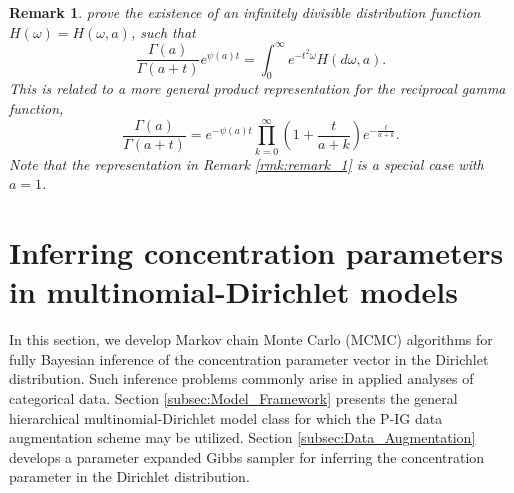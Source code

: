 \documentclass{statsoc}
\newtheorem{remark}{Remark}
\begin{document}
\begin{remark}
\cite{roynette2005couples} prove the existence of an infinitely divisible distribution function $H(\omega) = H(\omega, a)$, such that 
$$
\frac{\Gamma(a)}{\Gamma(a+t)} e^{\psi(a)t} = \int_0^\infty e^{-t^2 \omega} H(d\omega, a).
$$
This is related to a more general product representation for the reciprocal gamma function, 
\begin{equation}
\frac{\Gamma(a)}{\Gamma\left(a + t\right)} = e^{-\psi(a)t}\prod_{k=0}^{\infty}\left( 1 + \frac{t}{a+ k} \right)e^{-\frac{t}{a+k}}.
\end{equation}
Note that the representation in Remark \ref{rmk:remark_1} is a special case with $a = 1$.
\end{remark}

\section{Inferring concentration parameters in multinomial-Dirichlet models}
\label{sec:Conentration_Inference}
In this section, we develop Markov chain Monte Carlo (MCMC) algorithms for fully Bayesian inference of the concentration parameter vector in the Dirichlet distribution.  Such inference problems commonly arise in applied analyses of categorical data.  Section \ref{subsec:Model_Framework} presents the general hierarchical multinomial-Dirichlet model class for which the P-IG data augmentation scheme may be utilized.  Section \ref{subsec:Data_Augmentation} develops a parameter expanded Gibbs sampler for inferring the concentration parameter in the Dirichlet distribution.  
\end{document}
